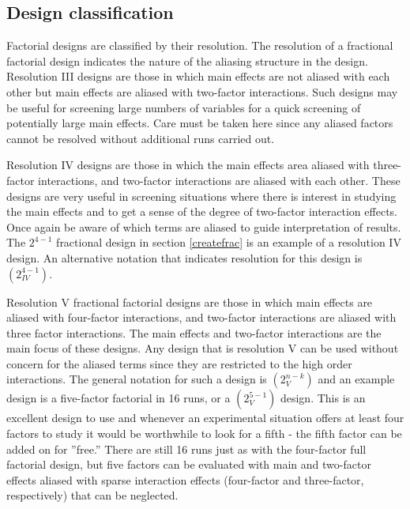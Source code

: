 \subsection{Design classification}
Factorial designs are classified by their resolution.  The resolution of a fractional factorial design indicates the nature of the aliasing structure in the design. Resolution III designs are those in which main effects are not aliased with each other but main effects are aliased with two-factor interactions. Such designs may be useful for screening large numbers of variables for a quick screening of potentially large main effects. Care must be taken here since any aliased factors cannot be resolved without additional runs carried out.

Resolution IV designs are those in which the main effects area aliased with three-factor interactions, and two-factor interactions are aliased with each other.  These designs are very useful in screening situations where there is interest in studying the main effects and to get a sense of the degree of two-factor interaction effects.  Once again be aware of which terms are aliased to guide interpretation of results. The $2^{4-1}$ fractional design in section \ref{createfrac} is an example of a resolution IV design. An alternative notation that indicates resolution for this design is $(2^{4-1}_{IV})$.

Resolution V fractional factorial designs are those in which main effects are aliased with four-factor interactions, and two-factor interactions are aliased with three factor interactions.  The main effects and two-factor interactions are the main focus of these designs. Any design that is resolution V can be used without concern for the aliased terms since they are restricted to the high order interactions. The general notation for such a design is $(2^{n-k}_{V})$ and an example design is a five-factor factorial in 16 runs, or a $(2^{5-1}_{V})$ design.  This is an excellent design to use and whenever an experimental situation offers at least four factors to study it would be worthwhile to look for a fifth - the fifth factor can be added on for ''free.''  There are still 16 runs just as with the four-factor full factorial design, but five factors can be evaluated with main and two-factor effects aliased with sparse interaction effects (four-factor and three-factor, respectively) that can be neglected.

